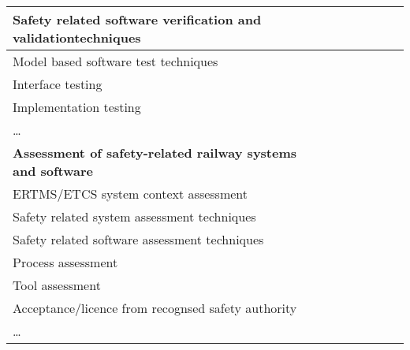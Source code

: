 \documentclass[a4paper, 11pt]{article}
\begin{document}
\begin{center}
\begin{longtable}{|r|r|r|r|r|r|r|r|}
    \hline
    \multicolumn{1}{|l|}{Safety related software verification and validationtechniques} & \multicolumn{1}{l|}{} &       &       &       &       &       &  \bigstrut\\
    \hline
    \multicolumn{1}{|l|}{Model based software test techniques } & \multicolumn{1}{l|}{} &       &       &       &       &       &  \bigstrut\\
    \hline
    \multicolumn{1}{|l|}{Interface testing} & \multicolumn{1}{l|}{} &       &       &       &       &       &  \bigstrut\\
    \hline
    \multicolumn{1}{|l|}{Implementation testing} & \multicolumn{1}{l|}{} &       &       &       &       &       &  \bigstrut\\
    \hline
    \multicolumn{1}{|l|}{…} & \multicolumn{1}{l|}{} &       &       &       &       &       &  \bigstrut[t]\\
    \multicolumn{1}{|l|}{\textbf{Assessment of safety-related railway systems and software}} & \multicolumn{1}{l|}{\textbf{}} &       &       &       &       &       &  \\
    \multicolumn{1}{|l|}{ERTMS/ETCS system context assessment} & \multicolumn{1}{l|}{} &       &       &       &       &       &  \bigstrut[b]\\
    \hline
    \multicolumn{1}{|l|}{Safety related system assessment techniques} & \multicolumn{1}{l|}{} &       &       &       &       &       &  \bigstrut\\
    \hline
    \multicolumn{1}{|l|}{Safety related software assessment techniques} & \multicolumn{1}{l|}{} &       &       &       &       &       &  \bigstrut\\
    \hline
    \multicolumn{1}{|l|}{Process assessment} & \multicolumn{1}{l|}{} &       &       &       &       &       &  \bigstrut\\
    \hline
    \multicolumn{1}{|l|}{Tool assessment} & \multicolumn{1}{l|}{} &       &       &       &       &       &  \bigstrut\\
    \hline
    \multicolumn{1}{|l|}{Acceptance/licence from recognsed safety authority} & \multicolumn{1}{l|}{} &       &       &       &       &       &  \bigstrut\\
    \hline
    \multicolumn{1}{|l|}{…} & \multicolumn{1}{l|}{} &       &       &       &       &       &  \bigstrut\\
    \hline
 
    \end{longtable}%




\end{center}
\end{document}
